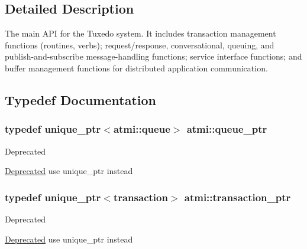 \subsection{Detailed Description}
The main A\+P\+I for the Tuxedo system. It includes transaction management functions (routines, verbs); request/response, conversational, queuing, and publish-\/and-\/subscribe message-\/handling functions; service interface functions; and buffer management functions for distributed application communication. 

\subsection{Typedef Documentation}
\hypertarget{group__atmi_gaf8c3e342d908ddc295b73c376b7515ca}{}
\subsubsection[{queue\+\_\+ptr}]{\setlength{\rightskip}{0pt plus 5cm}typedef unique\+\_\+ptr$<${\bf atmi\+::queue}$>$ {\bf atmi\+::queue\+\_\+ptr}}\label{group__atmi_gaf8c3e342d908ddc295b73c376b7515ca}
\begin{DoxyRefDesc}{Deprecated}
\item[\hyperlink{deprecated__deprecated000004}{Deprecated}]use unique\+\_\+ptr instead \end{DoxyRefDesc}
\hypertarget{group__atmi_gafc1ae4cdb2829f98c37f27b472fcb867}{}
\subsubsection[{transaction\+\_\+ptr}]{\setlength{\rightskip}{0pt plus 5cm}typedef unique\+\_\+ptr$<$transaction$>$ {\bf atmi\+::transaction\+\_\+ptr}}\label{group__atmi_gafc1ae4cdb2829f98c37f27b472fcb867}
\begin{DoxyRefDesc}{Deprecated}
\item[\hyperlink{deprecated__deprecated000003}{Deprecated}]use unique\+\_\+ptr instead \end{DoxyRefDesc}



